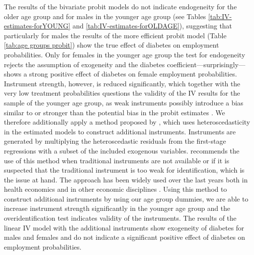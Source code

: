The results of the bivariate probit models do not indicate
endogeneity for the older age group and for males in the younger age
group (see Tables \ref{tab:IV-estimates-forYOUNG} and \ref{tab:IV-estimates-forOLDAGE}),
suggesting that particularly for males the results of the more efficient
probit model (Table \ref{tab:age groups probit}) show the true effect
of diabetes on employment probabilities. Only for females in the younger
age group the test for endogeneity rejects the assumption of exogeneity
and the diabetes coefficient---surprisingly---shows a strong positive
effect of diabetes on female employment probabilities. Instrument strength,
however, is reduced significantly, which together with the very low
treatment probabilities questions the validity of the \ac{IV} results
for the sample of the younger age group, as weak instruments possibly
introduce a bias similar to or stronger than the potential bias in
the probit estimates \parencite{Staiger1997}. We therefore additionally
apply a method proposed by \textcite{Lewbel2012}, which uses heteroscedasticity
in the estimated models to construct additional instruments. Instruments
are generated by multiplying the heteroscedastic residuals from the
first-stage regressions with a subset of the included exogenous variables.
\textcite{Lewbel2012} recommends the use of this method when traditional
instruments are not available or if it is suspected that the traditional
instrument is too weak for identification, which is the issue at hand.
The approach has been widely used over the last years both in health
economics \parencite{Drichoutis2011,Kelly2012,Schroeter2012,Brown2014}
and in other economic disciplines \parencite{Huang2009a,Emran2012,Denny2013}.
Using this method to construct additional instruments by using our
age group dummies, we are able to increase instrument strength significantly
in the younger age group and the overidentification test indicates
validity of the instruments. The results of the linear \ac{IV} model
with the additional instruments show exogeneity of diabetes for males
and females and do not indicate a significant positive effect of diabetes
on employment probabilities.

